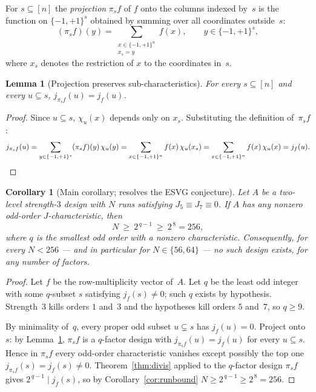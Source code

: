 \documentclass[11pt]{article}
\newtheorem{lemma}[theorem]{Lemma}
\newtheorem{corollary}[theorem]{Corollary}
\theoremstyle{definition}
\newcommand{\Fpm}{\{-1,+1\}}
\newcommand{\jc}{j}
\begin{document}
For $s\subseteq[n]$ the \emph{projection} $\pi_s f$ of $f$ onto the columns
indexed by~$s$ is the function on $\Fpm^{s}$ obtained by summing over all
coordinates outside~$s$:
\begin{equation}\label{eq:projdef}
  (\pi_s f)(y)=\sum_{\substack{x\in\Fpm^n\\x_s=y}} f(x),\qquad y\in\Fpm^{s},
\end{equation}
where $x_s$ denotes the restriction of $x$ to the coordinates in~$s$.

\begin{lemma}[Projection preserves sub-characteristics]\label{lem:proj}
For every $s\subseteq[n]$ and every $u\subseteq s$,
$\jc_{\pi_s f}(u)=\jc_f(u)$.
\end{lemma}

\begin{proof}
Since $u\subseteq s$, $\chi_u(x)$ depends only on $x_s$. Substituting the
definition of~$\pi_s f$:
\[
\jc_{\pi_s f}(u)
   =\sum_{y\in\Fpm^s}(\pi_s f)(y)\,\chi_u(y)
   =\sum_{x\in\Fpm^n} f(x)\,\chi_u(x_s)
   =\sum_{x\in\Fpm^n} f(x)\,\chi_u(x)=\jc_f(u).\qedhere
\]
\end{proof}

\begin{corollary}[Main corollary; resolves the ESVG conjecture]\label{cor:main}
Let $A$ be a two-level strength-$3$ design with $N$ runs satisfying
$J_5\equiv J_7\equiv 0$. If $A$ has any nonzero odd-order
$J$-characteristic, then
\begin{equation}\label{eq:mainbound}
  N\ \ge\ 2^{\,q-1}\ \ge\ 2^{\,8}=256,
\end{equation}
where $q$ is the smallest odd order with a nonzero characteristic.
Consequently, for every $N<256$ --- and in particular for $N\in\{56,64\}$ ---
no such design exists, for any number of factors.
\end{corollary}

\begin{proof}
Let $f$ be the row-multiplicity vector of~$A$.
Let $q$ be the least odd integer with some $q$-subset $s$ satisfying
$\jc_f(s)\ne 0$; such $q$ exists by hypothesis. Strength~$3$ kills orders
$1$ and~$3$ and the hypotheses kill orders $5$ and~$7$, so $q\ge 9$.

By minimality of~$q$, every proper odd subset $u\subsetneq s$ has
$\jc_f(u)=0$. Project onto~$s$: by Lemma~\ref{lem:proj}, $\pi_s f$ is a
$q$-factor design with $\jc_{\pi_s f}(u)=\jc_f(u)$ for every $u\subseteq s$.
Hence in $\pi_s f$ every odd-order characteristic vanishes except possibly
the top one $\jc_{\pi_s f}(s)=\jc_f(s)\ne 0$. Theorem~\ref{thm:divis} applied to the $q$-factor design $\pi_s f$ gives
$2^{\,q-1}\mid \jc_f(s)$, so by Corollary~\ref{cor:runbound}
$N\ge 2^{\,q-1}\ge 2^{\,8}=256$.
\end{proof}
\end{document}
